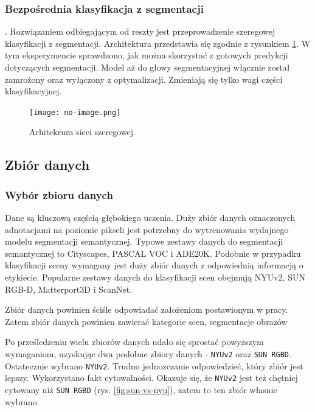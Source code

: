 \subsubsection{Bezpośrednia klasyfikacja z segmentacji}.
Rozwiązaniem odbiegającym od reszty jest przeprowadzenie szeregowej klasyfikacji z segmentacji. Architektura przedstawia się zgodnie z rysunkiem \ref{fig:multitask-parrarel}. W tym eksperymencie sprawdzono, jak można skorzystać z gotowych predykcji dotyczących segmentacji. Model aż do głowy segmentacyjnej włącznie został zamrożony oraz wyłączony z optymalizacji. Zmieniają się tylko wagi części klasyfikacyjnej.






\begin{figure}[ht!]
    \centering
    \texttt{[image: no-image.png]}
    \caption{Arhitekrura sieci szeregowej.}
    \label{fig:multitask-parrarel}
\end{figure}



\subsection{Zbiór  danych}
\subsubsection{Wybór zbioru danych}
Dane są kluczową częścią głębokiego uczenia. Duży zbiór danych oznaczonych adnotacjami na poziomie pikseli jest potrzebny do wytrenowania wydajnego modelu segmentacji semantycznej. Typowe zestawy danych do segmentacji semantycznej to Cityscapes, PASCAL VOC i ADE20K. Podobnie w przypadku klasyfikacji sceny wymagany jest duży zbiór danych z odpowiednią informacją o etykiecie. Popularne zestawy danych do klasyfikacji scen obejmują  NYUv2, SUN RGB-D, Matterport3D i ScanNet.

Zbiór danych powinien ściśle odpowiadać założeniom postawionym w pracy. Zatem zbiór danych powinien zawierać kategorie scen, segmentacje obrazów 

Po prześledzeniu wielu zbiorów danych udało się sprostać powyższym wymaganiom, uzyskując dwa podobne zbiory danych - \texttt{NYUv2} oraz \texttt{SUN RGBD}. Ostatecznie wybrano \texttt{NYUv2}. Trudno jednozczanie odpowiedzieć, który zbiór jest lepszy. Wykorzystano fakt cytowalności. Okazuje się, że \texttt{NYUv2} jest też chętniej cytowany niż \texttt{SUN RGBD} (rys. \ref{fig:sun-vs-nyu}), zatem to ten zbiór własnie wybrano.

